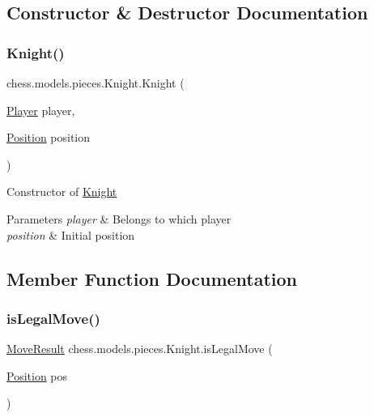 \subsection{Constructor \& Destructor Documentation}
\mbox{\label{classchess_1_1models_1_1pieces_1_1_knight_aa435be794e37d426954f2853a4aac26a}} 
\subsubsection{\texorpdfstring{Knight()}{Knight()}}
{\footnotesize\ttfamily chess.\+models.\+pieces.\+Knight.\+Knight (\begin{DoxyParamCaption}\item[{\mbox{\hyperlink{enumchess_1_1models_1_1enums_1_1_player}{Player}}}]{player,  }\item[{\mbox{\hyperlink{classchess_1_1models_1_1_position}{Position}}}]{position }\end{DoxyParamCaption})}

Constructor of \mbox{\hyperlink{classchess_1_1models_1_1pieces_1_1_knight}{Knight}}


\begin{DoxyParams}{Parameters}
{\em player} & Belongs to which player \\
\hline
{\em position} & Initial position \\
\hline
\end{DoxyParams}


\subsection{Member Function Documentation}
\mbox{\label{classchess_1_1models_1_1pieces_1_1_knight_af1018a686f81f9627d2851c919280448}} 
\subsubsection{\texorpdfstring{is\+Legal\+Move()}{isLegalMove()}}
{\footnotesize\ttfamily \mbox{\hyperlink{enumchess_1_1models_1_1enums_1_1_move_result}{Move\+Result}} chess.\+models.\+pieces.\+Knight.\+is\+Legal\+Move (\begin{DoxyParamCaption}\item[{\mbox{\hyperlink{classchess_1_1models_1_1_position}{Position}}}]{pos }\end{DoxyParamCaption})}

